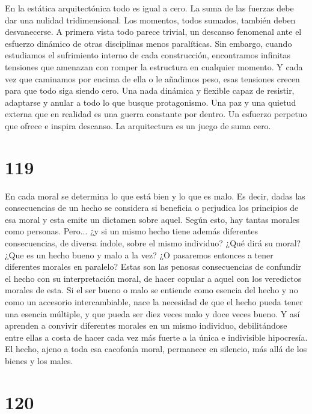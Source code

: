 \documentclass[a4paper,11pt,openright,twocolumn]{book}
\begin{document}
En la estática arquitectónica todo es igual a cero. La suma de las fuerzas debe dar una nulidad
tridimensional. Los momentos, todos sumados, también deben desvanecerse. A primera vista todo parece 
trivial, un descanso fenomenal ante el esfuerzo dinámico de otras disciplinas menos paralíticas. Sin embargo,
cuando estudiamos el sufrimiento interno de cada construcción, encontramos infinitas tensiones que amenazan
con romper la estructura en cualquier momento. Y cada vez que caminamos por encima de ella o le añadimos
peso, esas tensiones crecen para que todo siga siendo cero. Una nada dinámica y flexible capaz de
resistir, adaptarse y anular a todo lo que busque protagonismo. Una paz y una quietud externa que en realidad
es una guerra constante por dentro. Un esfuerzo perpetuo que ofrece e inspira descanso. La arquitectura es un
juego de suma cero. 

\section*{119}

En cada moral se determina lo que está bien y lo que es malo. Es decir, dadas las consecuencias de un hecho
se considera si beneficia o perjudica los principios de esa moral y esta emite un dictamen sobre aquel. Según 
esto, hay tantas morales como personas. Pero... ¿y si un mismo hecho tiene además diferentes consecuencias, de diversa
índole, sobre el mismo individuo? ¿Qué dirá su moral? ¿Que es un hecho bueno y malo a la vez? ¿O pasaremos
entonces a tener diferentes morales en paralelo? Estas son las penosas consecuencias de confundir el hecho
con su interpretación moral, de hacer copular a aquel con los veredictos morales de esta. Si el ser bueno
o malo se entiende como esencia del hecho y no como un accesorio intercambiable, nace la necesidad de 
que el hecho pueda tener una esencia múltiple, y que pueda ser diez veces malo y doce veces bueno. Y así
aprenden a convivir diferentes morales en un mismo individuo, debilitándose entre ellas a costa de hacer
cada vez más fuerte a la única e indivisible hipocresía. El hecho, ajeno a toda esa cacofonía moral,
permanece en silencio, más allá de los bienes y los males. 

\section*{120}
\end{document}
